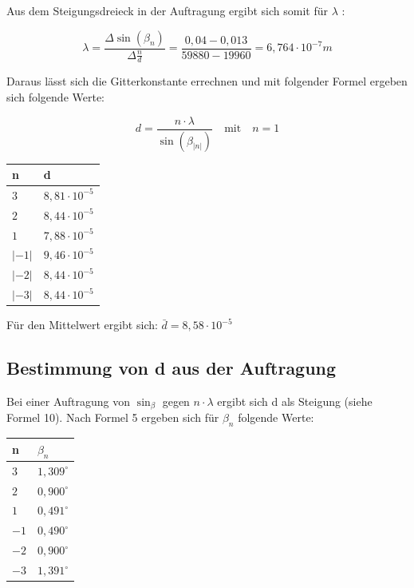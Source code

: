 \documentclass[12pt,a4paper,titlepage,headinclude,bibtotoc]{scrartcl}
\begin{document}
Aus dem Steigungsdreieck in der Auftragung ergibt sich somit für $\lambda$ :

\begin{equation}
\lambda =  \frac{\Delta \sin(\beta_n)}{\Delta\frac{n}{d}} = \frac{0,04 - 0,013}{59880 - 19960} = 6,764 \cdot 10^{-7} m
\end{equation}

Daraus lässt sich die Gitterkonstante errechnen und mit folgender Formel ergeben sich folgende Werte:

\begin{equation}
d = \dfrac{n\cdot \lambda}{\sin(\beta_|n|)} \quad \mathrm{mit}\quad n= 1 
\end{equation}

\begin{table} [h]
\centering
\begin{tabular}{|p{4 cm}||p{4 cm}|}
        \hline
		n & d \\
         \hline 
         $3$ & $8,81\cdot 10^{-5}$  \\
         \hline
         $2$ & $8,44 \cdot 10 ^{-5}$ \\
         \hline
         $1$ & $7,88\cdot 10^{-5}$\\
         \hline
         $|-1|$ & $9,46 \cdot 10^{-5} $   \\
         \hline
         $|-2|$ & $8,44\cdot 10^{-5}  $  \\
         \hline             
         $|-3|$ & $8,44\cdot 10^{-5}$   \\
         \hline
\end{tabular}
\end{table}

Für den Mittelwert ergibt sich:
$\bar{d} = 8,58\cdot 10^{-5}$

\subsection{Bestimmung von d aus der Auftragung}

Bei einer Auftragung von $\sin_\beta $ gegen $n \cdot \lambda $ ergibt sich d als Steigung (siehe Formel 10). 
Nach Formel 5 ergeben sich für $\beta_n$ folgende Werte:

\begin{table} [h]
\centering
\begin{tabular}{|p{4 cm}||p{4 cm}|}
        \hline
		n & $\beta_n$ \\
         \hline 
         $3$ & $1,309^\circ$  \\
         \hline
         $2$ & $0,900^\circ$ \\
         \hline
         $1$ & $0,491^\circ$\\
         \hline
         $-1$ & $0,490^\circ$   \\
         \hline
         $-2$ & $0,900^\circ$  \\
         \hline             
         $-3$ & $1,391^\circ$   \\
         \hline
\end{tabular}
\end{table}
\end{document}
